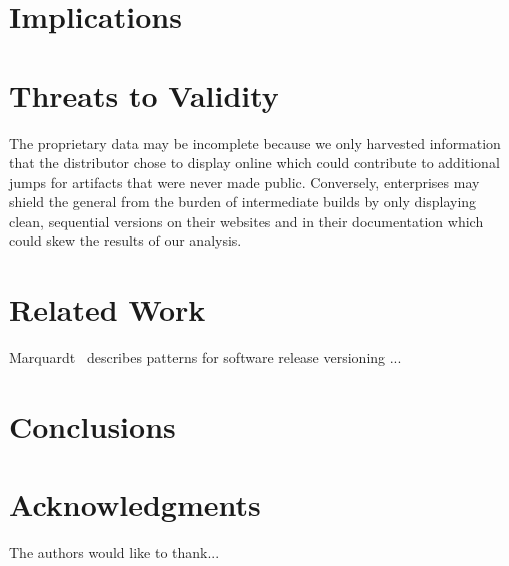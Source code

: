 \documentclass[conference]{IEEEtran}
\begin{document}
\section{Implications}

\section{Threats to Validity}

 The proprietary data may be incomplete because we only harvested information that the distributor chose to display online which could contribute to additional jumps for artifacts that were never made public. Conversely, enterprises may shield the general from the burden of intermediate builds by only displaying clean, sequential versions on their websites and in their documentation which could skew the results of our analysis. 



\section{Related Work}

Marquardt~\cite{Marquardt2010:EuroPLoP} describes patterns for software release versioning ...


\section{Conclusions}


\section*{Acknowledgments}

The authors would like to thank...

%

\end{document}
